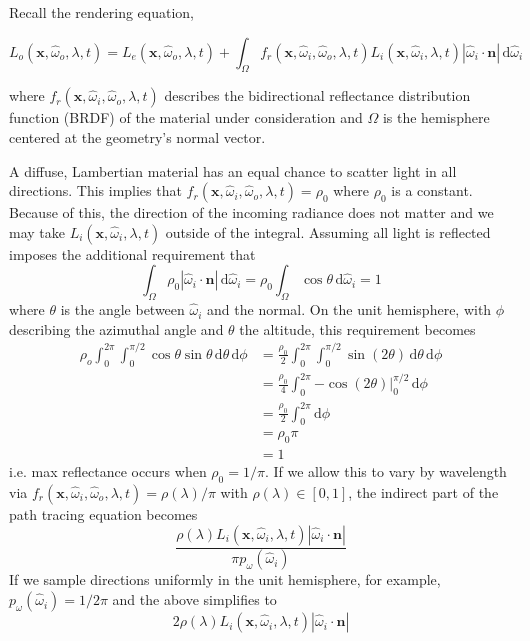 \documentclass{article}
\begin{document}
Recall the rendering equation,

\[
L_o(\mathbf{x}, \hat{\omega}_o, \lambda, t) = L_e(\mathbf{x}, \hat{\omega}_o, \lambda, t) + \int_\Omega f_r(\mathbf{x}, \hat{\omega}_i, \hat{\omega}_o, \lambda, t)L_i(\mathbf{x}, \hat{\omega}_i, \lambda, t)|\hat{\omega}_i\cdot\mathbf{n}|\,\mathrm{d}\hat{\omega}_i
\]

where $f_r(\mathbf{x}, \hat{\omega}_i, \hat{\omega}_o, \lambda, t)$ describes the bidirectional reflectance distribution function (BRDF) of the material under consideration and $\Omega$ is the hemisphere centered at the geometry's normal vector.

A diffuse, Lambertian material has an equal chance to scatter light in all directions. This implies that $f_r(\mathbf{x}, \hat{\omega}_i, \hat{\omega}_o, \lambda, t) = \rho_0$ where $\rho_0$ is a constant. Because of this, the direction of the incoming radiance does not matter and we may take $L_i(\mathbf{x}, \hat{\omega}_i, \lambda, t)$ outside of the integral. Assuming all light is reflected imposes the additional requirement that
\[
	\int_\Omega \rho_0|\hat{\omega}_i\cdot\mathbf{n}|\,\mathrm{d}\hat{\omega}_i = \rho_0\int_\Omega\cos\theta\,\mathrm{d}\hat{\omega}_i = 1
\]
where $\theta$ is the angle between $\hat{\omega}_i$ and the normal. On the unit hemisphere, with $\phi$ describing the azimuthal angle and $\theta$ the altitude, this requirement becomes
\begin{align*}
	\rho_o\int_0^{2\pi}\int_0^{\pi/2}\cos\theta\sin\theta\,\mathrm{d}\theta\,\mathrm{d}\phi &= \frac{\rho_0}{2}\int_0^{2\pi}\int_0^{\pi/2}\sin(2\theta)\,\mathrm{d}\theta\,\mathrm{d}\phi \\
	&= \frac{\rho_0}{4}\int_0^{2\pi}{-\cos(2\theta)}\Big|_0^{\pi/2}\,\mathrm{d}\phi \\
	&= \frac{\rho_0}{2}\int_0^{2\pi}\mathrm{d}\phi \\
	&= \rho_0\pi \\
	&= 1
\end{align*}
	i.e. max reflectance occurs when $\rho_0 = 1/\pi$. If we allow this to vary by wavelength via $f_r(\mathbf{x}, \hat{\omega}_i, \hat{\omega}_o, \lambda, t) = \rho(\lambda)/\pi$ with $\rho(\lambda) \in [0, 1]$, the indirect part of the path tracing equation becomes
	\[
		\frac{\rho(\lambda)L_i(\mathbf{x}, \hat{\omega}_i, \lambda, t)|\hat{\omega}_i\cdot\mathbf{n}|}{\pi p_\omega(\hat{\omega}_i)}
	\]
	If we sample directions uniformly in the unit hemisphere, for example, $p_\omega(\hat{\omega}_i) = 1/2\pi$ and the above simplifies to
	\[
	2\rho(\lambda)L_i(\mathbf{x}, \hat{\omega}_i, \lambda, t)|\hat{\omega}_i\cdot\mathbf{n}|
	\]
\end{document}
